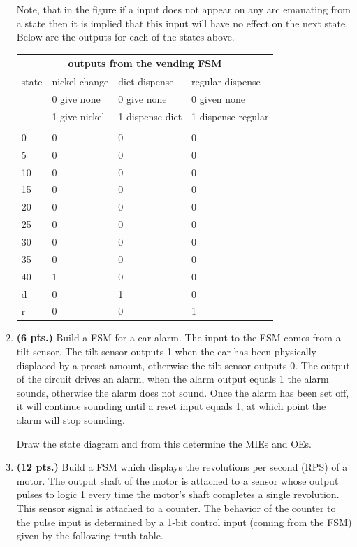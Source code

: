 \begin{enumerate}
\begin{solution}
{Note, that in the figure if a input does not appear on
any arc emanating from a state then it is implied that
this input will have no effect on the next state.  Below
are the outputs for each of the states above.

\begin{tabular}{|l||l|l|l|} \hline
\multicolumn{4}{|c|}{outputs from the vending FSM}              \\ \hline \hline
state & nickel change	& diet dispense & regular dispense      \\ \hline
      & 0 give none	& 0 give none	& 0 given none		\\ \hline
      & 1 give nickel	& 1 dispense diet & 1 dispense regular	\\ \hline
      & 		&		&			\\ \hline
0     & 0		& 0		& 0			\\ \hline
5     & 0		& 0		& 0			\\ \hline
10    & 0		& 0		& 0			\\ \hline
15    & 0		& 0		& 0			\\ \hline
20    & 0		& 0		& 0			\\ \hline
25    & 0		& 0		& 0			\\ \hline
30    & 0		& 0		& 0			\\ \hline
35    & 0		& 0		& 0			\\ \hline
40    & 1		& 0		& 0			\\ \hline
d     & 0		& 1		& 0			\\ \hline
r     & 0		& 0		& 1			\\ \hline
\end{tabular}
}\end{solution}



\item {\bf (6 pts.)}
Build a FSM for a car alarm.  The input to the FSM
comes from a tilt sensor.  The tilt-sensor outputs 1 when the 
car has been physically displaced by a preset amount, otherwise the
tilt sensor outputs 0.  The output of the circuit drives an alarm,
when the alarm output equals 1 the alarm sounds, otherwise the alarm
does not sound.  Once the alarm has been set off, it will continue
sounding until a reset input equals 1, at which point the alarm will
stop sounding.

Draw the state diagram and from this determine the MIEs and OEs.


\item {\bf (12 pts.)}
Build a FSM which displays the revolutions per second
(RPS) of a motor.  The output shaft of the motor is attached to 
a sensor whose output pulses to logic 1 every time the motor's shaft
completes a single revolution.  This sensor signal is attached to
a counter.  The behavior of the counter to the pulse input is determined
by a 1-bit control input (coming from the FSM) given by the following 
truth table.


\end{enumerate}
